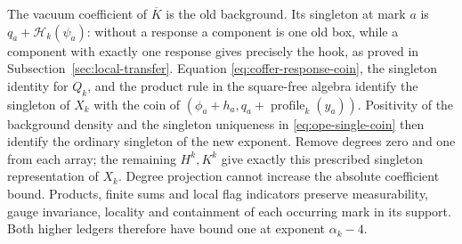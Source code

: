 The vacuum coefficient of $\overline K$ is the old background.
Its singleton at mark $a$ is $q_a+\mathcal H_k(\psi_a)$:
without a response a component is one old box, while a component
with exactly one response gives precisely the hook, as proved in
Subsection~\ref{sec:local-transfer}. Equation
\eqref{eq:coffer-response-coin}, the singleton identity for $Q_k$,
and the product rule in the square-free algebra identify the
singleton of $X_k$ with the coin of $(\phi_a+h_a,q_a+
\operatorname{profile}_k(y_a))$. Positivity of the background
density and the singleton uniqueness in
\eqref{eq:ope-single-coin} then identify the ordinary singleton
of the new exponent. Remove degrees zero and one from each
array; the remaining $H^k,K^k$ give exactly this prescribed
singleton representation of $X_k$. Degree projection cannot
increase the absolute coefficient bound. Products, finite sums
and local flag indicators preserve measurability, gauge
invariance, locality and containment of each occurring mark in
its support. Both higher ledgers therefore have bound one at
exponent $\alpha_k-4$.

